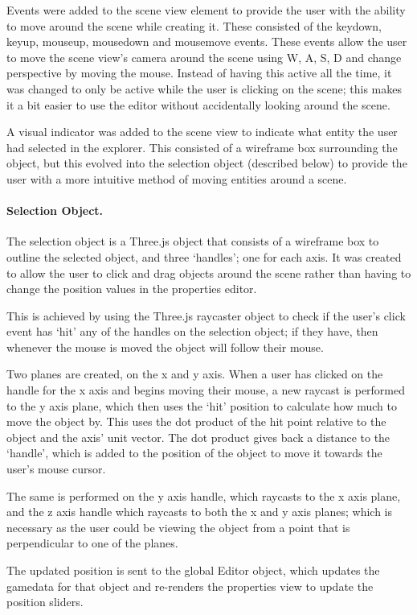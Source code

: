 	Events were added to the scene view element to provide the user with the ability to move around the scene while creating it. These consisted of the keydown, keyup, mouseup, mousedown and mousemove events. These events allow the user to move the scene view's camera around the scene using W, A, S, D and change perspective by moving the mouse. Instead of having this active all the time, it was changed to only be active while the user is clicking on the scene; this makes it a bit easier to use the editor without accidentally looking around the scene.

	A visual indicator was added to the scene view to indicate what entity the user had selected in the explorer. This consisted of a wireframe box surrounding the object, but this evolved into the selection object (described below) to provide the user with a more intuitive method of moving entities around a scene.

	\paragraph{Selection Object.}
	The selection object is a Three.js object that consists of a wireframe box to outline the selected object, and three `handles'; one for each axis. It was created to allow the user to click and drag objects around the scene rather than having to change the position values in the properties editor.

	This is achieved by using the Three.js raycaster object to check if the user's click event has `hit' any of the handles on the selection object; if they have, then whenever the mouse is moved the object will follow their mouse.

	Two planes are created, on the x and y axis. When a user has clicked on the handle for the x axis and begins moving their mouse, a new raycast is performed to the y axis plane, which then uses the `hit' position to calculate how much to move the object by. This uses the dot product of the hit point relative to the object and the axis' unit vector. The dot product gives back a distance to the `handle', which is added to the position of the object to move it towards the user's mouse cursor.

	The same is performed on the y axis handle, which raycasts to the x axis plane, and the z axis handle which raycasts to both the x and y axis planes; which is necessary as the user could be viewing the object from a point that is perpendicular to one of the planes.

	The updated position is sent to the global Editor object, which updates the gamedata for that object and re-renders the properties view to update the position sliders.
	
